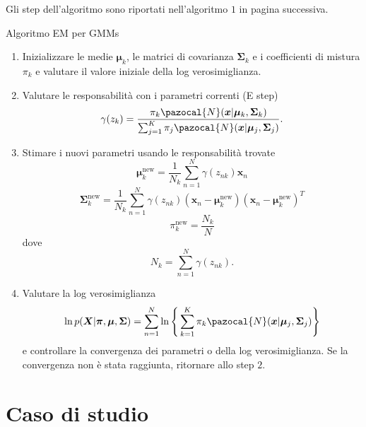 \documentclass{report}
\begin{document}
Gli step dell'algoritmo sono riportati nell'algoritmo $1$ in pagina successiva.
\begin{algorithm}\label{algoritmo}
\caption{Algoritmo EM per GMMs}
\begin{enumerate}
\item Inizializzare le medie $\bm\mu_k$, le matrici di covarianza $\bm\Sigma_k$ e i coefficienti di mistura $\pi_k$ e valutare il valore iniziale della log verosimiglianza.

\item Valutare le responsabilità con i parametri correnti (E step)
\begin{equation}
\gamma(z_k) = \frac{\pi_k\pazocal{N}(\bm{x}|\bm\mu_k, \bm\Sigma_k)}{\sum_{j=1}^{K} \pi_j\pazocal{N}(\bm{x}|\bm\mu_j, \bm\Sigma_j)}.
\end{equation}

\item Stimare i nuovi parametri usando le responsabilità trovate
\begin{equation}
\bm\mu_k^{\text{new}} = \frac{1}{N_k}\sum_{n=1}^N\gamma(z_{nk})\bm{x}_n
\end{equation}
\begin{equation}
\bm\Sigma_k^{\text{new}} = \frac{1}{N_k}\sum_{n=1}^N\gamma(z_{nk})(\bm{x}_n - \bm\mu_k^{\text{new}})(\bm{x}_n - \bm\mu_k^{\text{new}})^T
\end{equation}
\begin{equation}
\pi_k^{\text{new}} = \frac{N_k}{N}
\end{equation}
dove
\begin{equation}
N_k = \sum_{n=1}^N\gamma(z_{nk}).
\end{equation}

\item Valutare la log verosimiglianza
\begin{equation}
\ln p(\bm{X}|\bm\pi,\bm\mu,\bm\Sigma) = \sum_{n=1}^N\ln\Bigg\{\sum_{k=1}^K\pi_k\pazocal{N}(\bm{x}|\bm\mu_j, \bm\Sigma_j)\Bigg\}
\end{equation}
e controllare la convergenza dei parametri o della log verosimiglianza. Se la convergenza non è stata raggiunta, ritornare allo step $2$.
\end{enumerate}
\end{algorithm}

\chapter{Caso di studio}\label{caso di studio}
\end{document}

